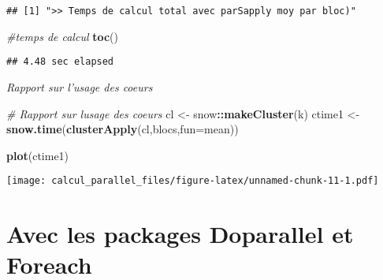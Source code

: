 \documentclass[
]{article}
\newenvironment{Shaded}{\begin{snugshade}}{\end{snugshade}}
\newcommand{\AttributeTok}[1]{\textcolor[rgb]{0.13,0.29,0.53}{#1}}
\newcommand{\CommentTok}[1]{\textcolor[rgb]{0.56,0.35,0.01}{\textit{#1}}}
\newcommand{\FunctionTok}[1]{\textcolor[rgb]{0.13,0.29,0.53}{\textbf{#1}}}
\newcommand{\NormalTok}[1]{#1}
\newcommand{\OtherTok}[1]{\textcolor[rgb]{0.56,0.35,0.01}{#1}}
\newcommand{\SpecialCharTok}[1]{\textcolor[rgb]{0.81,0.36,0.00}{\textbf{#1}}}
\begin{document}
\begin{verbatim}
## [1] ">> Temps de calcul total avec parSapply moy par bloc)"
\end{verbatim}

\begin{Shaded}
\begin{Highlighting}[]
\CommentTok{\#temps de calcul}
\FunctionTok{toc}\NormalTok{()}
\end{Highlighting}
\end{Shaded}

\begin{verbatim}
## 4.48 sec elapsed
\end{verbatim}

\emph{Rapport sur l'usage des coeurs}

\begin{Shaded}
\begin{Highlighting}[]
\CommentTok{\# Rapport sur l\textquotesingle{}usage des coeurs}
\NormalTok{cl }\OtherTok{\textless{}{-}}\NormalTok{ snow}\SpecialCharTok{::}\FunctionTok{makeCluster}\NormalTok{(k) }
\NormalTok{ctime1 }\OtherTok{\textless{}{-}} \FunctionTok{snow.time}\NormalTok{(}\FunctionTok{clusterApply}\NormalTok{(cl,blocs,}\AttributeTok{fun=}\NormalTok{mean))}

\FunctionTok{plot}\NormalTok{(ctime1)}
\end{Highlighting}
\end{Shaded}

\texttt{[image: calcul\_parallel\_files/figure-latex/unnamed-chunk-11-1.pdf]}

\hypertarget{avec-les-packages-doparallel-et-foreach}{%
\section{Avec les packages Doparallel et
Foreach}\label{avec-les-packages-doparallel-et-foreach}}
\end{document}
